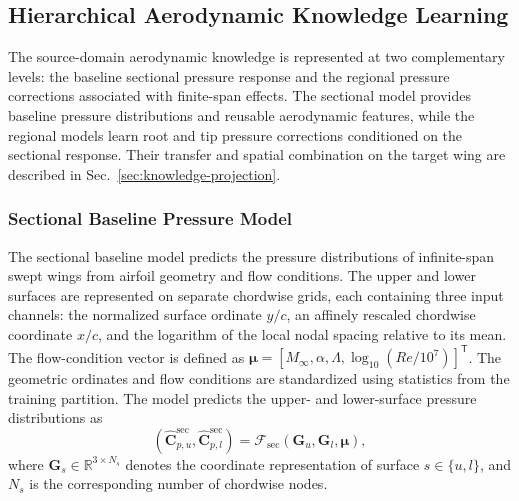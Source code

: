 
\subsection{Hierarchical Aerodynamic Knowledge Learning}
\label{sec:knowledge-learning}

The source-domain aerodynamic knowledge is represented at two complementary levels: the baseline sectional pressure response and the regional pressure corrections associated with finite-span effects. The sectional model provides baseline pressure distributions and reusable aerodynamic features, while the regional models learn root and tip pressure corrections conditioned on the sectional response. Their transfer and spatial combination on the target wing are described in Sec.~\ref{sec:knowledge-projection}.

\subsubsection{Sectional Baseline Pressure Model}
\label{sec:sectional-baseline}

The sectional baseline model predicts the pressure distributions of infinite-span swept wings from airfoil geometry and flow conditions. The upper and lower surfaces are represented on separate chordwise grids, each containing three input channels: the normalized surface ordinate $y/c$, an affinely rescaled chordwise coordinate $x/c$, and the logarithm of the local nodal spacing relative to its mean. The flow-condition vector is defined as $\boldsymbol{\mu}=[M_\infty,\alpha,\Lambda,\log_{10}(Re/10^{7})]^{\mathsf T}$. The geometric ordinates and flow conditions are standardized using statistics from the training partition. The model predicts the upper- and lower-surface pressure distributions as
\begin{equation}
    \left(\widehat{\mathbf C}_{p,u}^{\mathrm{sec}},
          \widehat{\mathbf C}_{p,l}^{\mathrm{sec}}\right)
    =\mathcal F_{\mathrm{sec}}\!\left(\mathbf G_u,\mathbf G_l,\boldsymbol{\mu}\right),
    \label{eq:sectional-baseline-map}
\end{equation}
where $\mathbf G_s\in\mathbb R^{3\times N_s}$ denotes the coordinate representation of surface $s\in\{u,l\}$, and $N_s$ is the corresponding number of chordwise nodes.

